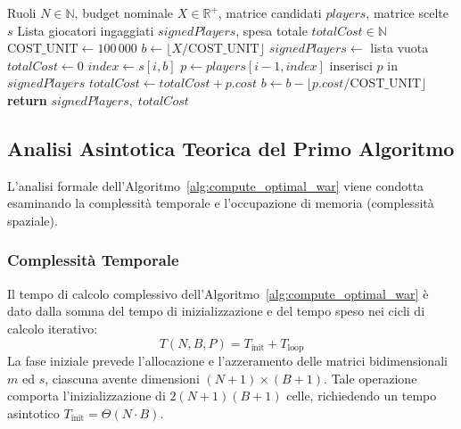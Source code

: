 \begin{algorithm}[H]
	\small
	\caption{Ricostruzione della Rosa Ottima mediante Backtracking}
	\label{alg:reconstruct_optimal_roster}
	\begin{algorithmic}[1]
		\Require Ruoli $N \in \mathbb{N}$, budget nominale $X \in \mathbb{R}^+$, matrice candidati $\mathit{players}$, matrice scelte $s$
		\Ensure Lista giocatori ingaggiati $\mathit{signedPlayers}$, spesa totale $\mathit{totalCost} \in \mathbb{N}$
		\State $\text{COST\_UNIT} \gets 100\,000$
		\State $b \gets \lfloor X / \text{COST\_UNIT} \rfloor$
		\State $\mathit{signedPlayers} \gets$ lista vuota
		\State $\mathit{totalCost} \gets 0$
		 
		\State $\mathit{index} \gets s[i, b]$
		 
		\State $p \gets \mathit{players}[i - 1, \mathit{index}]$
		\State inserisci $p$ in $\mathit{signedPlayers}$
		\State $\mathit{totalCost} \gets \mathit{totalCost} + p.\mathit{cost}$
		\State $b \gets b - \lfloor p.\mathit{cost} / \text{COST\_UNIT} \rfloor$ 
		\EndIf
		\EndFor
		\State \textbf{return} $\mathit{signedPlayers}, \; \mathit{totalCost}$
		\EndProcedure
	\end{algorithmic}
\end{algorithm}

\subsection{Analisi Asintotica Teorica del Primo Algoritmo}
L'analisi formale dell'Algoritmo~\ref{alg:compute_optimal_war} viene condotta esaminando la complessità temporale e l'occupazione di memoria (complessità spaziale).

\subsubsection{Complessità Temporale}
Il tempo di calcolo complessivo dell'Algoritmo~\ref{alg:compute_optimal_war} è dato dalla somma del tempo di inizializzazione e del tempo speso nei cicli di calcolo iterativo:
\begin{equation}
	T(N, B, P) = T_{\text{init}} + T_{\text{loop}}
\end{equation}
La fase iniziale prevede l'allocazione e l'azzeramento delle matrici bidimensionali $m$ ed $s$, ciascuna avente dimensioni $(N + 1) \times (B + 1)$. Tale operazione comporta l'inizializzazione di $2(N+1)(B+1)$ celle, richiedendo un tempo asintotico $T_{\text{init}} = \Theta(N \cdot B)$.

